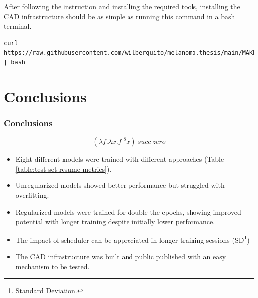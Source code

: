 \documentclass[dvipsnames,mathserif]{beamer}
\begin{document}
{\begin{frame}[fragile]
      After following the instruction and installing the required tools, installing the CAD infrastructure should
      be as simple as running this command in a bash terminal.

      \vspace{0.1cm}

      \begin{Verbatim}[fontsize=\tiny]
curl https://raw.githubusercontent.com/wilberquito/melanoma.thesis/main/MAKE.sh | bash
      \end{Verbatim}

    \end{frame}


    \section{Conclusions}


    \begin{frame}
      \frametitle{Conclusions}


      \[(\lambda f. \lambda x. f^{\circ 8} x)\ succ\ zero\]
    \end{frame}

    \begin{frame}
      \begin{itemize}
        \item Eight different models were trained with different approaches (Table \ref{table:test-set-resume-metrics}).
        \item Unregularized models showed better performance but struggled with overfitting.
        \item Regularized models were trained for double the epochs, showing
          improved potential with longer training despite initially lower
          performance.
        \item The impact of scheduler can be appreciated in longer training sessions (SD\footnote{Standard Deviation.})
        \item The CAD infrastructure was built and public published with an easy mechanism to be tested.
      \end{itemize}




\end{frame}}
\end{document}

